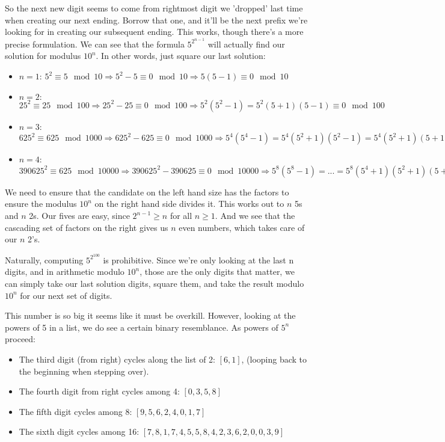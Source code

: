 \documentclass[11pt, oneside]{article} 	%
\begin{document}
So the next new digit seems to come from rightmost digit we 'dropped' last time when creating our next ending.  Borrow that one, and it'll be the next prefix we're looking for in creating our subsequent ending.  This works, though there's a more precise formulation.  We can see that the formula $5^{2^{n-1}}$ will actually find our solution for modulus $10^n$.  In other words, just square our last solution: 

\begin{itemize}
\item $n=1$: $5^2 \equiv 5 \mod 10 \Rightarrow 5^2 - 5 \equiv 0 \mod 10 \Rightarrow 5(5-1) \equiv 0 \mod 10$
\item $n=2:$ $25^2 \equiv 25 \mod 100 \Rightarrow 25^2 - 25 \equiv 0 \mod 100 \Rightarrow 5^2(5^2-1) = 5^2(5+1)(5-1) \equiv 0 \mod 100$
\item $n=3$: $625^2 \equiv 625 \mod 1000 \Rightarrow 625^2 - 625 \equiv 0 \mod 1000 \Rightarrow 5^4(5^4-1) = 5^4(5^2+1)(5^2-1) = 5^4(5^2+1)(5+1)(5-1) \equiv 0 \mod 1000$
\item $n=4$:   $390625^2 \equiv 625 \mod 10000 \Rightarrow 390625^2 - 390625 \equiv 0 \mod 10000 \Rightarrow 5^8(5^8-1) = ... =5^8(5^4+1)(5^2+1)(5+1)(5-1) \equiv 0 \mod 10000$
\end{itemize}

We need to ensure that the candidate on the left hand size has the factors to ensure the modulus $10^n$ on the right hand side divides it.  This works out to $n$ 5s and $n$ 2s.  Our fives are easy, since $2^{n-1} \geq n$ for all $n \geq 1$.  And we see that the cascading set of factors on the right gives us $n$ even numbers, which takes care of our $n$ 2's.

Naturally, computing $5^{2^{100}}$ is prohibitive.  Since we're only looking at the last n digits, and in arithmetic modulo $10^n$, those are the only digits that matter, we can simply take our last solution digits, square them, and take the result modulo $10^n$ for our next set of digits.

This number is so big it seems like it must be overkill.  However, looking at the powers of 5 in a list, we do see a certain binary resemblance.  As powers of $5^n$ proceed:
\begin{itemize}
\item The third digit (from right) cycles along the list of 2: $[6, 1]$, (looping back to the beginning when stepping over).
\item The fourth digit from right cycles among 4: $[0, 3, 5, 8]$
\item The fifth digit cycles among 8: $[9,5,6,2,4,0,1,7]$
\item The sixth digit cycles among 16: $[7,8,1,7,4,5,5,8,4,2,3,6,2,0,0,3,9]$
\end{itemize}
\end{document}
